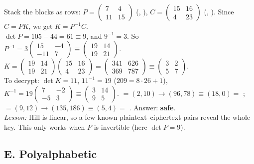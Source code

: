 \ans Stack the blocks as rows: $P = \begin{pmatrix}7&4\\11&15\end{pmatrix}$ (, ), $C = \begin{pmatrix}15&16\\4&23\end{pmatrix}$ (, ).
Since $C = PK$, we get $K = P^{-1}C$.\\
$\det P = 105 - 44 = 61 \equiv 9$, and $9^{-1} = 3$. So $P^{-1} = 3\begin{pmatrix}15&-4\\-11&7\end{pmatrix} \equiv \begin{pmatrix}19&14\\19&21\end{pmatrix}$.\\
$K = \begin{pmatrix}19&14\\19&21\end{pmatrix}\begin{pmatrix}15&16\\4&23\end{pmatrix} = \begin{pmatrix}341&626\\369&787\end{pmatrix} \equiv \boxed{\begin{pmatrix}3&2\\5&7\end{pmatrix}}$.\\
To decrypt: $\det K = 11$, $11^{-1} = 19$ ($209 = 8\cdot26+1$), $K^{-1} = 19\begin{pmatrix}7&-2\\-5&3\end{pmatrix} \equiv \begin{pmatrix}3&14\\9&5\end{pmatrix}$.
 $=(2,10) \to (96, 78) \equiv (18, 0) = $ ;  $=(9,12) \to (135, 186) \equiv (5, 4) = $ . Answer: \textbf{safe}.\\
\emph{Lesson:} Hill is linear, so a few known plaintext--ciphertext pairs reveal the whole key. This only works when $P$ is invertible (here $\det P = 9$).

\subsection*{E. Polyalphabetic}

